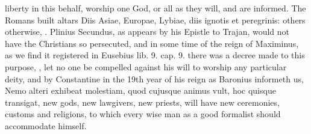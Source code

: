 {liberty in this behalf, worship one God, or all as they will, and are
informed. The Romans built altars Diis Asiae, Europae, Lybiae, diis
ignotis et peregrinis: others otherwise, \etc{}. Plinius Secundus, as
appears by his Epistle to Trajan, would not have the Christians so
persecuted, and in some time of the reign of Maximinus, as we find it
registered in Eusebius lib. 9. cap. 9. there was a decree made to this
purpose, , let no
one be compelled against his will to worship any particular deity, and
by Constantine in the 19th year of his reign as Baronius
informeth us, Nemo alteri exhibeat molestiam, quod cujusque animus
vult, hoc quisque transigat, new gods, new lawgivers, new priests, will
have new ceremonies, customs and religions, to which every wise man as
a good formalist should accommodate himself.


}
